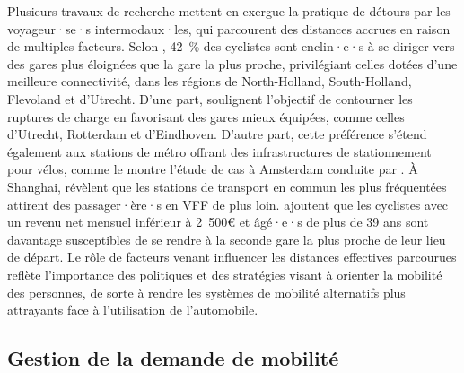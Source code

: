 \begin{refsegment}
Plusieurs travaux de recherche mettent en exergue la pratique de détours par les voyageur·se·s intermodaux·les, qui parcourent des distances accrues en raison de multiples facteurs. Selon \textcolor{blue}{\textcite[102]{kampen_understanding_2020}}, 42~\% des cyclistes sont enclin·e·s à se diriger vers des gares plus éloignées que la gare la plus proche, privilégiant celles dotées d'une meilleure connectivité, dans les régions de North-Holland, South-Holland, Flevoland et d'Utrecht. D'une part, \textcolor{blue}{\textcite[18]{jonkeren_bicycle-train_2021}} soulignent l'objectif de contourner les ruptures de charge en favorisant des gares mieux équipées, comme celles d'Utrecht, Rotterdam et d'Eindhoven. D'autre part, cette préférence s'étend également aux stations de métro offrant des infrastructures de stationnement pour vélos, comme le montre l'étude de cas à Amsterdam conduite par \textcolor{blue}{\textcite[342]{kampen_bicycle_2021}}. À Shanghai, \textcolor{blue}{\textcite[7]{li_exploring_2021}} révèlent que les stations de transport en commun les plus fréquentées attirent des passager·ère·s en \acrshort{VFF} de plus loin. \textcolor{blue}{\textcite[143]{kampen_understanding_2021}} ajoutent que les cyclistes avec un revenu net mensuel inférieur à 2~500€ et âgé·e·s de plus de 39 ans sont davantage susceptibles de se rendre à la seconde gare la plus proche de leur lieu de départ. Le rôle de facteurs venant influencer les distances effectives parcourues reflète l'importance des politiques et des stratégies visant à orienter la mobilité des personnes, de sorte à rendre les systèmes de mobilité alternatifs plus attrayants face à l'utilisation de l'automobile.%

\subsection{Gestion de la demande de mobilité
    \label{chap2:gestion-demande-mobilite}
    }


\end{refsegment}
